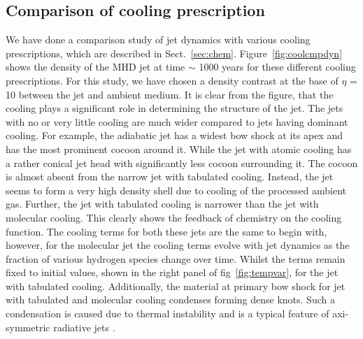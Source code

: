 \documentclass[useAMS,usenatbib]{mn2e}
\begin{document}
\subsection{Comparison of cooling prescription}
\label{ssec:coolres}
We have done a comparison study of jet dynamics with various cooling
prescriptions, which are described in
Sect.~\ref{sec:chem}. Figure~\ref{fig:coolcmpdyn} shows the density of the MHD
jet at time $\sim$ 1000 years for these different cooling
prescriptions. For this study, we have chosen a density contrast at the base of
$\eta$ = 10 between the jet and ambient medium.
It is clear from the figure, that the cooling plays a
significant role in determining the structure of the jet. The jets
with no or very little cooling are much wider compared to
jets having dominant cooling. For example, the adiabatic jet
has a widest bow shock at its apex and has the most prominent cocoon
around it. While the jet with atomic cooling has a rather conical
jet head with significantly less cocoon surrounding it. The cocoon is
almost absent from the narrow jet with tabulated cooling. Instead, the jet
seems to form a very high density shell due to cooling of the
processed ambient gas. Further, the jet with tabulated cooling is narrower than the jet with molecular cooling. This clearly
shows the feedback of chemistry on the cooling function. The cooling
terms for both these jets are the same to begin with, however,
for the molecular jet the cooling terms evolve with jet dynamics as the fraction of
various hydrogen species change over time. Whilst the terms remain fixed to initial values, shown in the right panel of fig~\ref{fig:tempvar}, for the jet with tabulated
cooling. Additionally, the material at primary bow shock for jet
with tabulated and molecular cooling condenses forming dense knots. 
Such a condensation is caused due to thermal instability and is 
a typical feature of axi-symmetric radiative jets 
\citep[see, for e.g,][]{Blondin:1990p2130,Cerqueira:1999p15052}.
%
\end{document}

